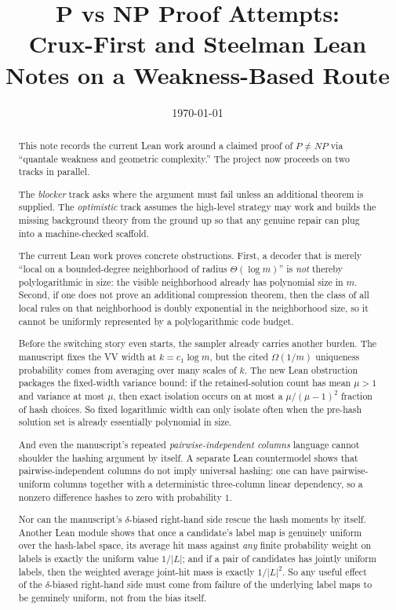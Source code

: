\documentclass[11pt]{article}
\title{P vs NP Proof Attempts:\\
Crux-First and Steelman Lean Notes on a Weakness-Based Route}
\author{}
\date{\today}
\theoremstyle{remark}
\begin{document}
\maketitle

\begin{abstract}
This note records the current Lean work around a claimed proof of
$P \neq NP$ via ``quantale weakness and geometric complexity.''  The project now
proceeds on two tracks in parallel.

The \emph{blocker} track asks where the argument must fail unless an additional theorem
is supplied.  The \emph{optimistic} track assumes the high-level strategy may work and
builds the missing background theory from the ground up so that any genuine repair can
plug into a machine-checked scaffold.

The current Lean work proves concrete obstructions.  First, a decoder that is merely
``local on a bounded-degree neighborhood of radius $\Theta(\log m)$'' is \emph{not} thereby
polylogarithmic in size: the visible neighborhood already has polynomial size in $m$.
Second, if one does not prove an additional compression theorem, then the class of all local
rules on that neighborhood is doubly exponential in the neighborhood size, so it cannot be
uniformly represented by a polylogarithmic code budget.

Before the switching story even starts, the sampler already carries another burden.  The
manuscript fixes the VV width at \(k=c_1\log m\), but the cited \(\Omega(1/m)\) uniqueness
probability comes from averaging over many scales of \(k\).  The new Lean obstruction packages the
fixed-width variance bound: if the retained-solution count has mean \(\mu>1\) and variance at most
\(\mu\), then exact isolation occurs on at most a \(\mu/(\mu-1)^2\) fraction of hash choices.
So fixed logarithmic width can only isolate often when the pre-hash solution set is already
essentially polynomial in size.

And even the manuscript's repeated \emph{pairwise-independent columns} language cannot shoulder the
hashing argument by itself.  A separate Lean countermodel shows that pairwise-independent columns do
not imply universal hashing: one can have pairwise-uniform columns together with a deterministic
three-column linear dependency, so a nonzero difference hashes to zero with probability \(1\).

Nor can the manuscript's \(\delta\)-biased right-hand side rescue the hash moments by itself.
Another Lean module shows that once a candidate's label map is genuinely uniform over the hash-label
space, its average hit mass against \emph{any} finite probability weight on labels is exactly the
uniform value \(1/|L|\); and if a pair of candidates has jointly uniform labels, then the weighted
average joint-hit mass is exactly \(1/|L|^2\).  So any useful effect of the \(\delta\)-biased
right-hand side must come from failure of the underlying label maps to be genuinely uniform, not
from the bias itself.


\end{abstract}
\end{document}
